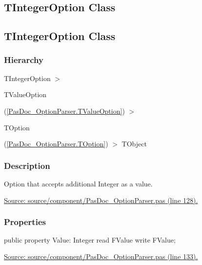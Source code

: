 \documentclass{report}
\newif\ifpdf
\begin{document}
\subsection*{\large{\textbf{TIntegerOption Class}}\normalsize\hspace{1ex}\hrulefill}
\else
\subsection*{TIntegerOption Class}
\fi
\label{PasDoc_OptionParser.TIntegerOption}
\subsubsection*{\large{\textbf{Hierarchy}}\normalsize\hspace{1ex}\hfill}
TIntegerOption {$>$} \begin{ttfamily}TValueOption\end{ttfamily}(\ref{PasDoc_OptionParser.TValueOption}) {$>$} \begin{ttfamily}TOption\end{ttfamily}(\ref{PasDoc_OptionParser.TOption}) {$>$} 
TObject
\subsubsection*{\large{\textbf{Description}}\normalsize\hspace{1ex}\hfill}
Option that accepts additional Integer as a value.\par
\href{https://github.com/pasdoc/pasdoc/blob/master/source/component/PasDoc_OptionParser.pas#L128}{Source: source/component/PasDoc{\_}OptionParser.pas (line 128).}\subsubsection*{\large{\textbf{Properties}}\normalsize\hspace{1ex}\hfill}
\begin{list}{}{
\setlength{\itemindent}{0cm}
\setlength{\listparindent}{0cm}
\setlength{\leftmargin}{\evensidemargin}
\addtolength{\leftmargin}{\tmplength}
\settowidth{\labelsep}{X}
\addtolength{\leftmargin}{\labelsep}
\setlength{\labelwidth}{\tmplength}
}
\label{PasDoc_OptionParser.TIntegerOption-Value}
\item[\textbf{Value}\hfill]
\ifpdf
\begin{flushleft}
\fi
\begin{ttfamily}
public property Value: Integer read FValue write FValue;\end{ttfamily}

\ifpdf
\end{flushleft}
\fi


\par  \par
\href{https://github.com/pasdoc/pasdoc/blob/master/source/component/PasDoc_OptionParser.pas#L133}{Source: source/component/PasDoc{\_}OptionParser.pas (line 133).}\end{list}
\end{document}
